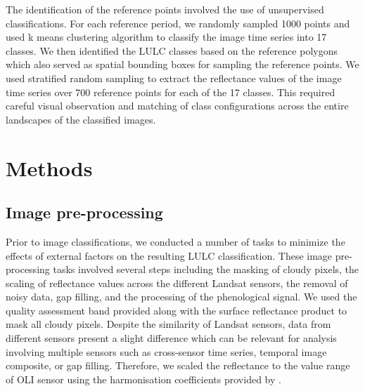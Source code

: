 \documentclass[12pt,oneside,preprint,3p,authoryear,times]{elsarticle} %
\begin{document}
The identification of the reference points involved the use of
unsupervised classifications. For each reference period, we randomly
sampled 1000 points and used k means clustering algorithm to classify
the image time series into 17 classes. We then identified the LULC
classes based on the reference polygons which also served as spatial
bounding boxes for sampling the reference points. We used stratified
random sampling to extract the reflectance values of the image time
series over 700 reference points for each of the 17 classes. This
required careful visual observation and matching of class configurations
across the entire landscapes of the classified images.

\hypertarget{methods}{%
\section{Methods}\label{methods}}

\hypertarget{ref41}{%
\subsection{Image pre-processing}\label{ref41}}

Prior to image classifications, we conducted a number of tasks to
minimize the effects of external factors on the resulting LULC
classification. These image pre-processing tasks involved several steps
including the masking of cloudy pixels, the scaling of reflectance
values across the different Landsat sensors, the removal of noisy data,
gap filling, and the processing of the phenological signal. We used the
quality assessment band provided along with the surface reflectance
product to mask all cloudy pixels. Despite the similarity of Landsat
sensors, data from different sensors present a slight difference which
can be relevant for analysis involving multiple sensors such as
cross-sensor time series, temporal image composite, or gap filling.
Therefore, we scaled the reflectance to the value range of OLI sensor
using the harmonisation coefficients provided by \citet{Roy-et-al-2016}.
\end{document}
